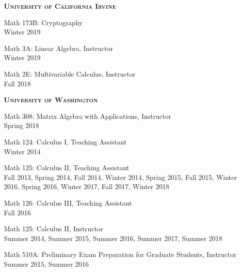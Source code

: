 \documentclass[12pt]{article}
\newenvironment{date_section}
	{
	\vspace{-1ex}
	\leftmargini = 15ex
		\begin{itemize}[
			labelsep = *,
			labelwidth = 9ex,
			labelindent = 0ex,
			itemindent = !,
			font=\normalfont,
			align=parleft
		]{}
		\itemsep=-1.5mm
	}
	{\end{itemize}\vspace{-2ex}}
\newcommand{\yearmo}[2]{
	\item[
		{\makebox[1ex][r]{#1}}
		\hspace{1ex}
		{\makebox[1ex][l]{#2} }
		] }
\begin{document}
	\begin{date_section}

		\yearmo{}{}\textbf{\textsc{University of California Irvine}}

		\yearmo{}{} Math 173B: Cryptography
		\\
		Winter 2019

		\yearmo{}{} Math 3A: Linear Algebra, Instructor
		\\
		Winter 2019

		\yearmo{}{} Math 2E: Multivariable Calculus, Instructor
		\\
		Fall 2018

		\yearmo{}{}\textbf{\textsc{University of Washington}}

		\yearmo{}{} Math 308: Matrix Algebra with Applications, Instructor
		\\
		Spring 2018

		\yearmo{}{} Math 124: Calculus I, Teaching Assistant
		\\
		Winter 2014

		\yearmo{}{} Math 125: Calculus II, Teaching Assistant
		\\
		Fall 2013, Spring 2014, Fall 2014, Winter 2014, Spring 2015, Fall 2015, Winter 2016, Spring 2016, Winter 2017, Fall 2017, Winter 2018

		\yearmo{}{} Math 126: Calculus III, Teaching Assistant
		\\
		Fall 2016

		\yearmo{}{} Math 125: Calculus II, Instructor
		\\
		Summer 2014, Summer 2015, Summer 2016, Summer 2017, Summer 2018

		\yearmo{}{} Math 510A: Preliminary Exam Preparation for Graduate Students, Instructor
		\\
		Summer 2015, Summer 2016



\end{date_section}
\end{document}
